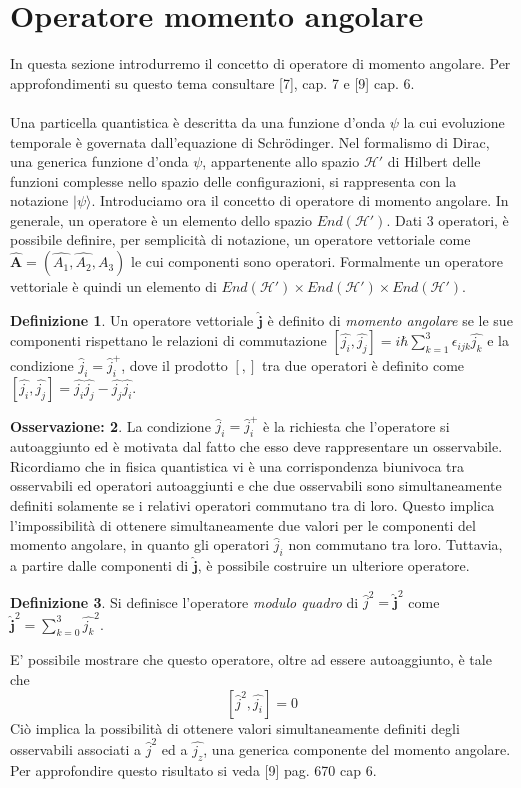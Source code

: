 \documentclass[12pt,a4paper]{report}
\theoremstyle{definition}
\newtheorem{Def}{Definizione}[chapter]
\theoremstyle{Theorem}
\theoremstyle{definition}
\theoremstyle{definition}
\theoremstyle{definition}
\newtheorem{Obs}[Def]{Osservazione:}
\begin{document}
\section{Operatore momento angolare}
In questa sezione introdurremo il concetto di operatore di momento angolare. Per approfondimenti su questo tema consultare [7], cap. 7 e [9] cap. 6. \\
\\
Una particella quantistica è descritta da una funzione d'onda $\psi$ la cui evoluzione temporale è governata dall'equazione di Schrödinger. Nel formalismo di Dirac, una generica funzione d'onda $\psi$, appartenente allo spazio $\mathcal{H'}$ di Hilbert delle funzioni complesse nello spazio delle configurazioni, si rappresenta con la notazione $|\psi\rangle$. Introduciamo ora il concetto di operatore di momento angolare. In generale, un operatore è un elemento dello spazio $End(\mathcal{H'})$. Dati 3 operatori, è possibile definire, per semplicità di notazione, un operatore vettoriale come $\hat{\textbf{A}}=(\hat{A_1},\hat{A_2},\hat{A_3})$ le cui componenti sono operatori. Formalmente un operatore vettoriale è quindi un elemento di $End(\mathcal{H'})\times End(\mathcal{H'})\times End(\mathcal{H'})$.
\begin{Def}
	Un operatore vettoriale $\hat{\textbf{j}}$ è definito di \textit{momento angolare} se le sue componenti rispettano le relazioni di commutazione $[\hat{j_i},\hat{j_j}]=i\hbar\sum_{k=1}^{3}\epsilon_{ijk}\hat{j_k}$ e la condizione $\hat{j}_i=\hat{j}^+_i$, dove il prodotto $[,]$ tra due operatori è definito come $[\hat{j_i},\hat{j_j}]=\hat{j_i}\hat{j_j}-\hat{j_j}\hat{j_i}$.
\end{Def} 
\begin{Obs}
La condizione $\hat{j}_i=\hat{j}^+_i$ è la richiesta che l'operatore si autoaggiunto ed è motivata dal fatto che esso deve rappresentare un osservabile. Ricordiamo che in fisica quantistica vi è una corrispondenza biunivoca tra osservabili ed operatori autoaggiunti e che due osservabili sono simultaneamente definiti solamente se i relativi operatori commutano tra di loro. Questo implica l'impossibilità di ottenere simultaneamente due valori per le componenti del momento angolare, in quanto gli operatori $\hat{j}_i$ non commutano tra loro. Tuttavia, a partire dalle componenti di $\hat{\textbf{j}}$, è possibile costruire un ulteriore operatore.
\end{Obs}
\begin{Def}
	Si definisce l'operatore \textit{modulo quadro} di $\hat{j}^2=\hat{\textbf{j}}^2$ come $\hat{\textbf{j}}^2=\sum_{k=0}^{3}\hat{j_k}^2$.
\end{Def}
E' possibile mostrare che questo operatore, oltre ad essere autoaggiunto, è tale che
$$[\hat{j}^2,\hat{j_i}]=0$$
Ciò implica la possibilità di ottenere valori simultaneamente definiti degli osservabili associati a $\hat{j}^2$ ed a $\hat{j_z}$, una generica componente del momento angolare.
Per approfondire questo risultato si veda [9] pag. 670 cap 6.
\end{document}
